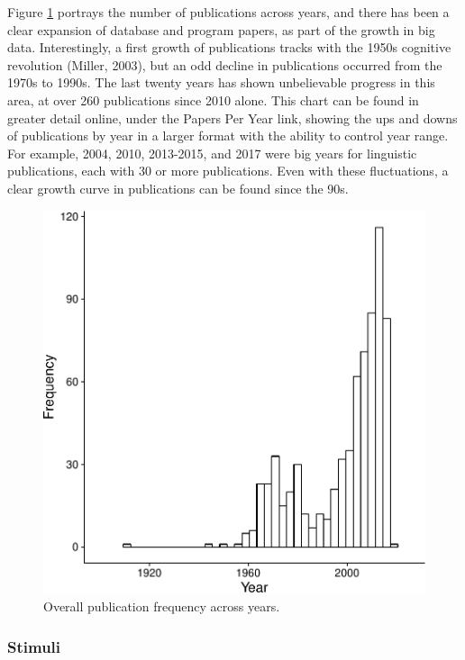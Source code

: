 \documentclass[english,man]{apa6}
\theoremstyle{definition}
\theoremstyle{definition}
\theoremstyle{definition}
\theoremstyle{remark}
\begin{document}
Figure \ref{fig:pub-fig} portrays the number of publications across
years, and there has been a clear expansion of database and program
papers, as part of the growth in big data. Interestingly, a first growth
of publications tracks with the 1950s cognitive revolution (Miller,
2003), but an odd decline in publications occurred from the 1970s to
1990s. The last twenty years has shown unbelievable progress in this
area, at over 260 publications since 2010 alone. This chart can be found
in greater detail online, under the Papers Per Year link, showing the
ups and downs of publications by year in a larger format with the
ability to control year range. For example, 2004, 2010, 2013-2015, and
2017 were big years for linguistic publications, each with 30 or more
publications. Even with these fluctuations, a clear growth curve in
publications can be found since the 90s.

\begin{figure}
\centering
\includegraphics{LAB_files/figure-latex/pub-fig-1.pdf}
\caption{\label{fig:pub-fig}Overall publication frequency across years.}
\end{figure}

\subsubsection{Stimuli}\label{stimuli}
\end{document}
